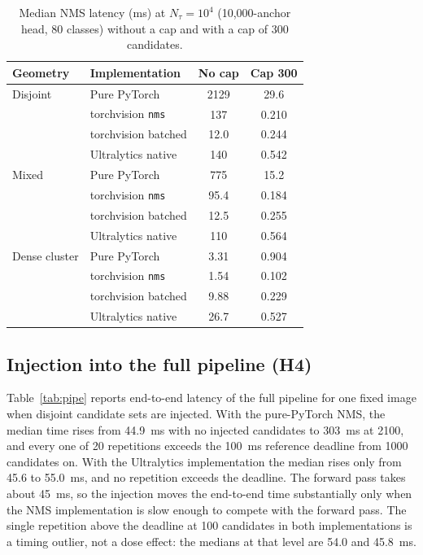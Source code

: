 \documentclass[a4paper,fleqn]{cas-dc}
\newcommand{\Ntau}{N_{\tau}}
\begin{document}
\begin{table}[t]
\centering\small
\caption{Median NMS latency (ms) at $\Ntau=10^4$ (10{,}000-anchor head, 80 classes) without a cap and with a cap of 300 candidates.}
\label{tab:cap}
\begin{tabular}{@{}llcc@{}}
\toprule
Geometry & Implementation & No cap & Cap 300 \\
\midrule
Disjoint & Pure PyTorch & 2129 & 29.6 \\
 & torchvision \texttt{nms} & 137 & 0.210 \\
 & torchvision batched & 12.0 & 0.244 \\
 & Ultralytics native & 140 & 0.542 \\
Mixed & Pure PyTorch & 775 & 15.2 \\
 & torchvision \texttt{nms} & 95.4 & 0.184 \\
 & torchvision batched & 12.5 & 0.255 \\
 & Ultralytics native & 110 & 0.564 \\
Dense cluster & Pure PyTorch & 3.31 & 0.904 \\
 & torchvision \texttt{nms} & 1.54 & 0.102 \\
 & torchvision batched & 9.88 & 0.229 \\
 & Ultralytics native & 26.7 & 0.527 \\
\bottomrule
\end{tabular}
\end{table}

\subsection{Injection into the full pipeline (H4)}
Table~\ref{tab:pipe} reports end-to-end latency of the full pipeline for one fixed image when disjoint candidate sets are injected. With the pure-PyTorch NMS, the median time rises from 44.9~ms with no injected candidates to 303~ms at 2100, and every one of 20 repetitions exceeds the 100~ms reference deadline from 1000 candidates on. With the Ultralytics implementation the median rises only from 45.6 to 55.0~ms, and no repetition exceeds the deadline. The forward pass takes about 45~ms, so the injection moves the end-to-end time substantially only when the NMS implementation is slow enough to compete with the forward pass. The single repetition above the deadline at 100 candidates in both implementations is a timing outlier, not a dose effect: the medians at that level are 54.0 and 45.8~ms.
\end{document}
